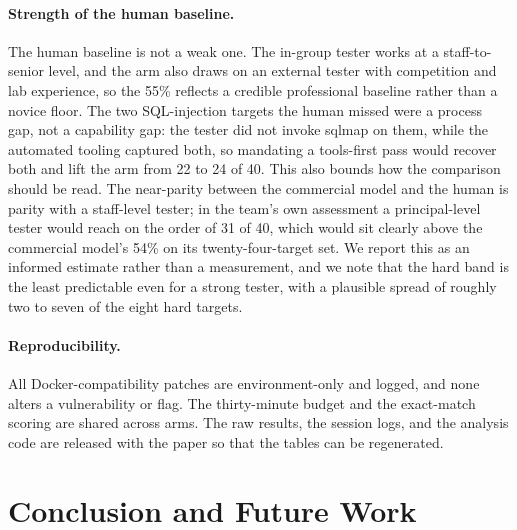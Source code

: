 \documentclass[11pt]{article}
\begin{document}
\paragraph{Strength of the human baseline.}
The human baseline is not a weak one. The in-group tester works at a staff-to-senior level, and the arm also draws on an external tester with competition and lab experience, so the 55\% reflects a credible professional baseline rather than a novice floor. The two SQL-injection targets the human missed were a process gap, not a capability gap: the tester did not invoke sqlmap on them, while the automated tooling captured both, so mandating a tools-first pass would recover both and lift the arm from 22 to 24 of 40. This also bounds how the comparison should be read. The near-parity between the commercial model and the human is parity with a staff-level tester; in the team's own assessment a principal-level tester would reach on the order of 31 of 40, which would sit clearly above the commercial model's 54\% on its twenty-four-target set. We report this as an informed estimate rather than a measurement, and we note that the hard band is the least predictable even for a strong tester, with a plausible spread of roughly two to seven of the eight hard targets.

\paragraph{Reproducibility.}
All Docker-compatibility patches are environment-only and logged, and none alters a vulnerability or flag. The thirty-minute budget and the exact-match scoring are shared across arms. The raw results, the session logs, and the analysis code are released with the paper so that the tables can be regenerated.

\section{Conclusion and Future Work}
\end{document}
